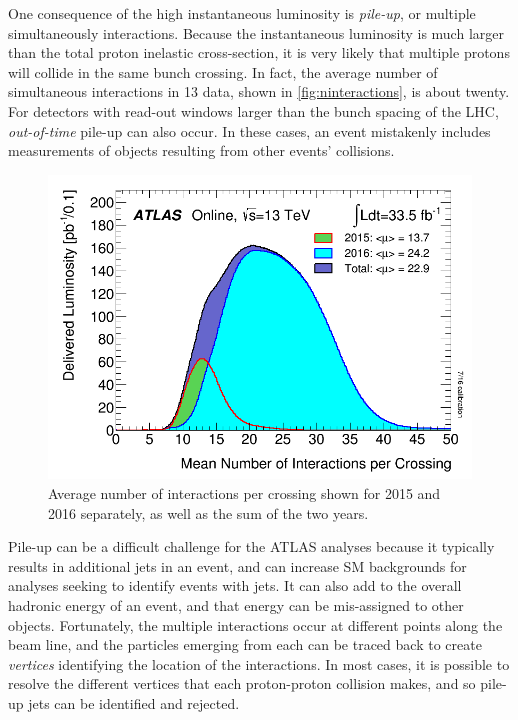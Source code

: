 One consequence of the high instantaneous luminosity is \textit{pile-up}, or multiple simultaneously interactions. Because the instantaneous luminosity is much larger than the total proton inelastic cross-section, it is very likely that multiple protons will collide in the same bunch crossing. In fact, the average number of simultaneous interactions in 13 \tev data, shown in \autoref{fig:ninteractions}, is about twenty. For detectors with read-out windows larger than the bunch spacing of the \ac{LHC}, \textit{out-of-time} pile-up can also occur. In these cases, an event mistakenly includes measurements of objects resulting from other events' collisions. 

\begin{centering}
\begin{figure}[!hbt]
\myfloatalign
\includegraphics[width=.85\linewidth]{figures/lhc/mu_2015_2016_LHCC.png}
\caption{Average number of interactions per crossing shown for 2015 and 2016 separately, as well as the sum of the two years.}
\label{fig:ninteractions}
\end{figure}
\end{centering}

Pile-up can be a difficult challenge for the \ac{ATLAS} analyses because it typically results in additional jets in an event, and can increase \ac{SM} backgrounds for analyses seeking to identify events with jets. It can also add to the overall hadronic energy of an event, and that energy can be mis-assigned to other objects. Fortunately, the multiple interactions occur at different points along the beam line, and the particles emerging from each can be traced back to create \textit{vertices} identifying the location of the interactions. In most cases, it is possible to resolve the different vertices that each proton-proton collision makes, and so pile-up jets can be identified and rejected. 


